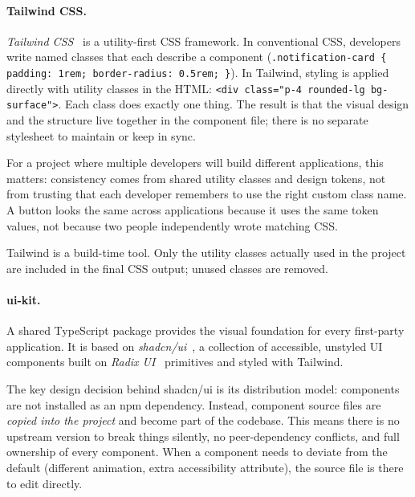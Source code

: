 \paragraph{Tailwind CSS.}
\emph{Tailwind CSS}~\cite{tailwind} is a utility-first CSS framework. In
conventional CSS, developers write named classes that each describe a component
(\texttt{.notification-card \{ padding: 1rem; border-radius: 0.5rem; \}}). In
Tailwind, styling is applied directly with utility classes in the HTML:
\texttt{<div class="p-4 rounded-lg bg-surface">}. Each class does exactly one
thing. The result is that the visual design and the structure live together in
the component file; there is no separate stylesheet to maintain or keep in sync.

For a project where multiple developers will build different applications, this
matters: consistency comes from shared utility classes and design tokens, not
from trusting that each developer remembers to use the right custom class name.
A button looks the same across applications because it uses the same token
values, not because two people independently wrote matching CSS.

Tailwind is a build-time tool. Only the utility classes actually used in the
project are included in the final CSS output; unused classes are removed.

\paragraph{ui-kit.}
A shared TypeScript package provides the visual foundation for every
first-party application. It is based on \emph{shadcn/ui}~\cite{shadcn},
a collection of accessible, unstyled UI components built on
\emph{Radix UI}~\cite{radix} primitives and styled with Tailwind.

The key design decision behind shadcn/ui is its distribution model: components
are not installed as an npm dependency. Instead, component source files are
\emph{copied into the project} and become part of the codebase. This means
there is no upstream version to break things silently, no peer-dependency
conflicts, and full ownership of every component. When a component needs to
deviate from the default (different animation, extra accessibility attribute),
the source file is there to edit directly.

